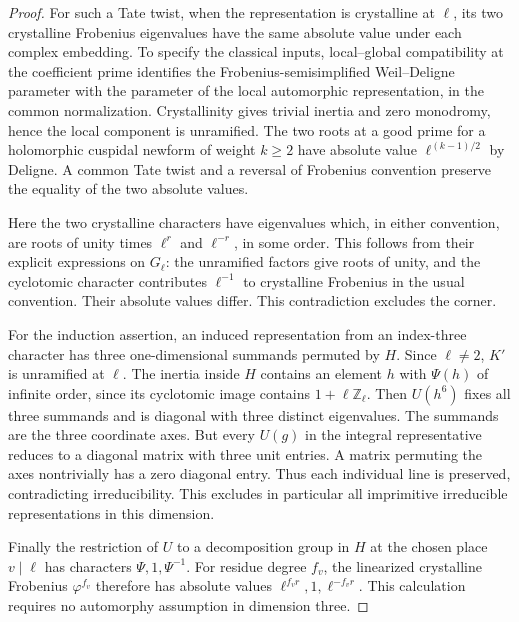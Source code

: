 \documentclass[a4paper,11pt]{article}
\theoremstyle{definition}
\theoremstyle{remark}
\newcommand{\ZZ}{\mathbb Z}\newcommand{\ord}{\operatorname{ord}}
\numberwithin{equation}{section}
\begin{document}
\begin{proof}
For such a Tate twist, when the representation is crystalline at \(\ell\), its two crystalline Frobenius eigenvalues have the same absolute value under each complex embedding. To specify the classical inputs, local--global compatibility at the coefficient prime identifies the Frobenius-semisimplified Weil--Deligne parameter with the parameter of the local automorphic representation, in the common normalization. Crystallinity gives trivial inertia and zero monodromy, hence the local component is unramified. The two roots at a good prime for a holomorphic cuspidal newform of weight \(k\ge2\) have absolute value \(\ell^{(k-1)/2}\) by Deligne. A common Tate twist and a reversal of Frobenius convention preserve the equality of the two absolute values. \cite{VI-IV-VI-saito40,VI-IV-VI-deligne40}

Here the two crystalline characters have eigenvalues which, in either convention, are roots of unity times \(\ell^r\) and \(\ell^{-r}\), in some order. This follows from their explicit expressions on \(G_\ell\): the unramified factors give roots of unity, and the cyclotomic character contributes \(\ell^{-1}\) to crystalline Frobenius in the usual convention. Their absolute values differ. This contradiction excludes the corner.

For the induction assertion, an induced representation from an index-three character has three one-dimensional summands permuted by \(H\). Since \(\ell\ne2\), \(K'\) is unramified at \(\ell\). The inertia inside \(H\) contains an element \(h\) with \(\Psi(h)\) of infinite order, since its cyclotomic image contains \(1+\ell\ZZ_\ell\). Then \(U(h^6)\) fixes all three summands and is diagonal with three distinct eigenvalues. The summands are the three coordinate axes. But every \(U(g)\) in the integral representative reduces to a diagonal matrix with three unit entries. A matrix permuting the axes nontrivially has a zero diagonal entry. Thus each individual line is preserved, contradicting irreducibility. This excludes in particular all imprimitive irreducible representations in this dimension.

Finally the restriction of \(U\) to a decomposition group in \(H\) at the chosen place \(v\mid\ell\) has characters \(\Psi,1,\Psi^{-1}\). For residue degree \(f_v\), the linearized crystalline Frobenius \(\varphi^{f_v}\) therefore has absolute values \(\ell^{f_vr},1,\ell^{-f_vr}\). This calculation requires no automorphy assumption in dimension three.
\end{proof}
\end{document}
